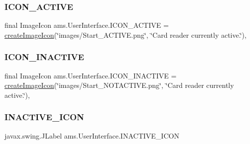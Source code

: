 \mbox{\label{classams_1_1_user_interface_aa059c1bdd7d1c11ee0930e7da113a836}} 
\subsubsection{\texorpdfstring{ICON\_ACTIVE}{ICON\_ACTIVE}}
{\footnotesize\ttfamily final Image\+Icon ams.\+User\+Interface.\+I\+C\+O\+N\+\_\+\+A\+C\+T\+I\+VE = \mbox{\hyperlink{classams_1_1_user_interface_ab22216d30202f196e243447004ef51cd}{create\+Image\+Icon}}(\char`\"{}images/Start\+\_\+\+A\+C\+T\+I\+V\+E.\+png\char`\"{}, \char`\"{}Card reader currently active.\char`\"{})\hspace{0.3cm}{\ttfamily [static]}, {\ttfamily [protected]}}

\mbox{\label{classams_1_1_user_interface_a77dfb30596c6419c587d65748c969b4f}} 
\subsubsection{\texorpdfstring{ICON\_INACTIVE}{ICON\_INACTIVE}}
{\footnotesize\ttfamily final Image\+Icon ams.\+User\+Interface.\+I\+C\+O\+N\+\_\+\+I\+N\+A\+C\+T\+I\+VE = \mbox{\hyperlink{classams_1_1_user_interface_ab22216d30202f196e243447004ef51cd}{create\+Image\+Icon}}(\char`\"{}images/Start\+\_\+\+N\+O\+T\+A\+C\+T\+I\+V\+E.\+png\char`\"{}, \char`\"{}Card reader currently active.\char`\"{})\hspace{0.3cm}{\ttfamily [static]}, {\ttfamily [protected]}}

\mbox{\label{classams_1_1_user_interface_a41ce6feb6a3a8e250a4a5d08543ea0e0}} 
\subsubsection{\texorpdfstring{INACTIVE\_ICON}{INACTIVE\_ICON}}
{\footnotesize\ttfamily javax.\+swing.\+J\+Label ams.\+User\+Interface.\+I\+N\+A\+C\+T\+I\+V\+E\+\_\+\+I\+C\+ON\hspace{0.3cm}{\ttfamily [static]}}

